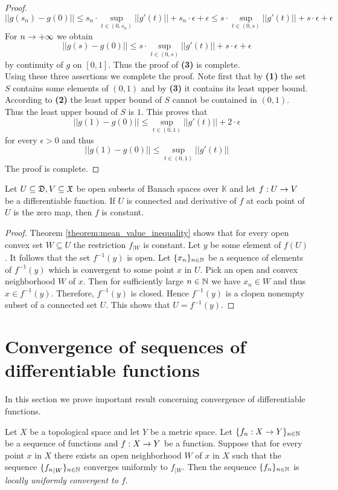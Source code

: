 \begin{proof}
$$||g(s_n) - g(0)||\leq s_n\cdot \sup_{t\in (0,s_n)}||g'(t)||+ s_n\cdot \epsilon + \epsilon \leq s\cdot \sup_{t\in (0,s)}||g'(t)||+ s\cdot \epsilon + \epsilon$$
For $n\rightarrow +\infty$ we obtain
$$||g(s) - g(0)|| \leq s\cdot \sup_{t\in (0,s)}||g'(t)||+ s\cdot \epsilon + \epsilon$$
by continuity of $g$ on $[0,1]$. Thus the proof of \textbf{(3)} is complete.\\
Using these three assertions we complete the proof. Note first that by \textbf{(1)} the set $S$ contains some elements of $(0,1)$ and by \textbf{(3)} it contains its least upper bound. According to \textbf{(2)} the least upper bound of $S$ cannot be contained in $(0,1)$. Thus the least upper bound of $S$ is $1$. This proves that
$$||g(1) - g(0)||\leq \sup_{t\in (0,1)}||g'(t)||+ 2\cdot \epsilon$$
for every $\epsilon > 0$ and thus
$$||g(1) - g(0)||\leq \sup_{t\in (0,1)}||g'(t)||$$
The proof is complete.
\end{proof}

\begin{corollary}\label{corollary:derivative_zero_on_connected_implies_that_function_is_constant}
Let $U\subseteq {\mathfrak D},V\subseteq {\mathfrak X}$ be open subsets of Banach spaces over $\mathbb{K}$ and let $f:U\rightarrow V$ be a differentiable function. If $U$ is connected and derivative of $f$ at each point of $U$ is the zero map, then $f$ is constant. 
\end{corollary}
\begin{proof}
Theorem \ref{theorem:mean_value_inequality} shows that for every open convex set $W\subseteq U$ the restriction $f_{\mid W}$ is constant. Let $y$ be some element of $f(U)$. It follows that the set $f^{-1}(y)$ is open. Let $\{x_n\}_{n\in {\mathbb N}}$ be a sequence of elements of $f^{-1}(y)$ which is convergent to some point $x$ in $U$. Pick an open and convex neighborhood $W$ of $x$. Then for sufficiently large $n\in {\mathbb N}$ we have $x_n\in W$ and thus $x \in f^{-1}(y)$. Therefore, $f^{-1}(y)$ is closed. Hence $f^{-1}(y)$ is a clopen nonempty subset of a connected set $U$. This shows that $U = f^{-1}(y)$. 
\end{proof}

\section{Convergence of sequences of differentiable functions}
\noindent
In this section we prove important result concerning convergence of differentiable functions. 

\begin{definition}
Let $X$ be a topological space and let $Y$ be a metric space. Let $\{f_n:X\rightarrow Y\}_{n\in {\mathbb N}}$ be a sequence of functions and $f:X\rightarrow Y$ be a function. Suppose that for every point $x$ in $X$ there exists an open neighborhood $W$ of $x$ in $X$ such that the sequence $\{{f_n}_{\mid W}\}_{n\in {\mathbb N}}$ converges uniformly to $f_{\mid W}$. Then the sequence $\{f_n\}_{n\in {\mathbb N}}$ is \textit{locally uniformly convergent to $f$}.
\end{definition}

